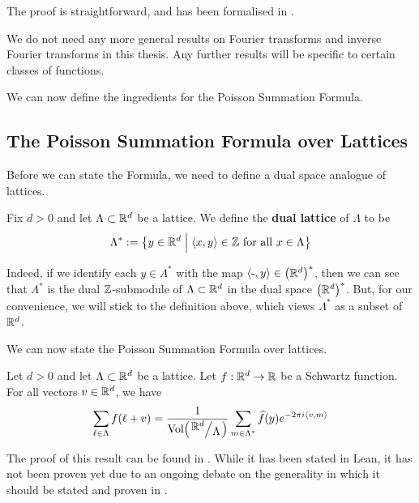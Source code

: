 The proof is straightforward, and has been formalised in \mathlib.

We do not need any more general results on Fourier transforms and inverse Fourier transforms in this thesis. Any further results will be specific to certain classes of functions.

We can now define the ingredients for the Poisson Summation Formula.

\subsection{The Poisson Summation Formula over Lattices}

Before we can state the Formula, we need to define a dual space analogue of lattices.

\begin{boxdefinition}
    Fix $d > 0$ and let $\Lambda \subset \mathbb{R}^d$ be a lattice. We define the \textbf{dual lattice} of $\Lambda$ to be
    \begin{align*}
        \Lambda^* := \left\{ y \in \mathbb{R}^d \; \middle\vert \; \left\langle x, y \right\rangle \in \mathbb{Z} \text{ for all } x \in \Lambda \right\}
    \end{align*}
\end{boxdefinition}

Indeed, if we identify each $y \in \Lambda^*$ with the map $\left\langle \text{-}, y \right\rangle \in \left( \mathbb{R}^d \right)^*$, then we can see that $\Lambda^*$ is the dual $\mathbb{Z}$-submodule of $\Lambda \subset \mathbb{R}^d$ in the dual space $\left( \mathbb{R}^{d} \right)^*$. But, for our convenience, we will stick to the definition above, which views $\Lambda^*$ as a subset of $\mathbb{R}^d$.

We can now state the Poisson Summation Formula over lattices.

\begin{boxtheorem}\label{Ch2:Thm:Poisson_Summation}
    Let $d > 0$ and let $\Lambda \subset \mathbb{R}^d$ be a lattice. Let $f : \mathbb{R}^d \to \mathbb{R}$ be a Schwartz function. For all vectors $v \in \mathbb{R}^d$, we have
    \begin{align*}
        \sum_{\ell \in \Lambda} \fof{\ell + v} = \frac{1}{\Volof{\quotient{\R^d}{\Lambda}}} \sum_{m \in \Lambda^*} \hat{f}(y) e^{-2\pi i \cycl{v, m}}
    \end{align*}
\end{boxtheorem}

The proof of this result can be found in \sorry{}. While it has been stated in Lean, it has not been proven yet due to an ongoing debate on the generality in which it should be stated and proven in \mathlib. %

